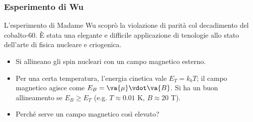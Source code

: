 \subsubsection{Esperimento di Wu}
L'esperimento di Madame Wu scoprò la violazione di parità col decadimento del cobalto-60. È stata una elegante e difficile applicazione di tenologie allo stato dell'arte di fisica nucleare e criogenica.
\begin{itemize}
    \item Si allineano gli spin nucleari con un campo magnetico esterno. 
    \item Per una certa temperatura, l'energia cinetica vale $E_T=k_bT$; il campo magnetico agisce come $E_B=\va{\mu}\vdot\va{B}$. Si ha un buon allineamento se $E_B\geq E_T$ (e.g. $T\approx0.01$ K, $B\approx20$ T).
    \item Perché serve un campo magnetico così elevato?
\end{itemize}